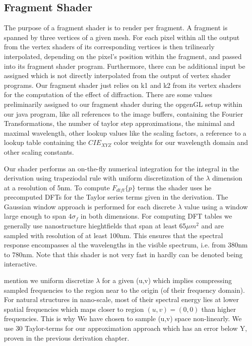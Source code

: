 \subsection{Fragment Shader}
The purpose of a fragment shader is to render per fragment. A fragment is spanned by three vertices of a given mesh. For each pixel within all the output from the vertex shaders of its corresponding vertices is then trilinearly interpolated, depending on the pixel's position within the fragment, and passed into its fragment shader program.
Furthermore, there can be additional input be assigned which is not directly interpolated from the output of vertex shader programs. Our fragment shader just relies on k1 and k2 from its vertex shaders for the computation of the effect of diffraction.
There are some values preliminarily assigned to our fragment shader during the opgenGL setup within our java program, like all references to the image buffers, containing the Fourier Transformations, the number of taylor step approximations, the minimal and maximal wavelength, other lookup values like the scaling factors, a reference to a lookup table containing the $CIE_{XYZ}$ color weights for our wavelength domain and other scaling constants.

Our shader performs an on-the-fly numerical integration for the integral in the derivation using trapeziodal rule with uniform discretization of the $\lambda$ dimension at a resolution of 5nm. To compute $F_{dtft}\{p\}$ terms the shader uses he precomputed DFTs for the Taylor series terms given in the derivation. The Gaussian window approach is performed for each discrete $\lambda$ value using a window large enough to span $4\sigma_f$ in both dimensions. For computing DFT tables we generally use nanostructure hieghtfields that span at least 65$\mu m^2$ and are sampled with resolution of at least 100nm. This ensures that the spectral response encompasses al the wavelengths in the visible spectrum, i.e. from 380nm to 780nm. Note that this shader is not very fast in hardly can be denoted being interactive. 

mention we uniform discretize $\lambda$ for a given (u,v) which implies compressing sampled frequencies to the region near to the origin (of their frequency domain). 
For natural structures in nano-scale, most of their spectral energy lies at lower spatial frequencies which maps closer to region $(u,v) = (0,0)$ than higher frequencies. This is why We have chosen to sample (u,v) space non-linearly. We use 30 Taylor-terms for our approximation approach which has an error below Y, proven in the previous derivation chapter.

